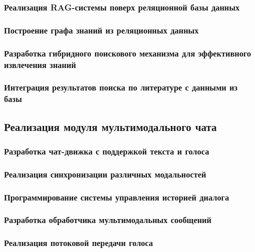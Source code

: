 \documentclass{syksu-coursework}
\begin{document}
\subsubsection{Реализация RAG-системы поверх реляционной базы данных}

\subsubsection{Построение графа знаний из реляционных данных}

\subsubsection{Разработка гибридного поискового механизма для эффективного извлечения знаний}

\subsubsection{Интеграция результатов поиска по литературе с данными из базы}

\subsection{Реализация модуля мультимодального чата}

\subsubsection{Разработка чат-движка с поддержкой текста и голоса}

\subsubsection{Реализация синхронизации различных модальностей}

\subsubsection{Программирование системы управления историей диалога}

\subsubsection{Разработка обработчика мультимодальных сообщений}

\subsubsection{Реализация потоковой передачи голоса}
\end{document}
